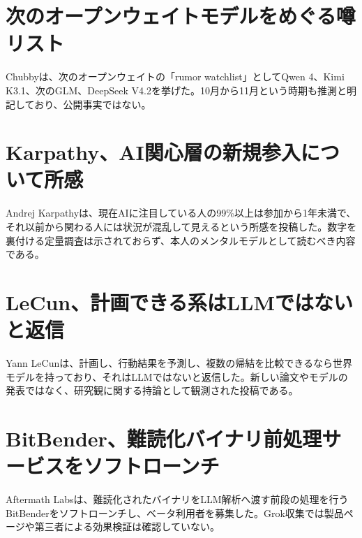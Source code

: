 \section{次のオープンウェイトモデルをめぐる噂リスト}
Chubbyは、次のオープンウェイトの「rumor watchlist」としてQwen 4、Kimi K3.1、次のGLM、DeepSeek V4.2を挙げた。10月から11月という時期も推測と明記しており、公開事実ではない。

\section{Karpathy、AI関心層の新規参入について所感}
Andrej Karpathyは、現在AIに注目している人の99\%以上は参加から1年未満で、それ以前から関わる人には状況が混乱して見えるという所感を投稿した。数字を裏付ける定量調査は示されておらず、本人のメンタルモデルとして読むべき内容である。

\section{LeCun、計画できる系はLLMではないと返信}
Yann LeCunは、計画し、行動結果を予測し、複数の帰結を比較できるなら世界モデルを持っており、それはLLMではないと返信した。新しい論文やモデルの発表ではなく、研究観に関する持論として観測された投稿である。

\section{BitBender、難読化バイナリ前処理サービスをソフトローンチ}
Aftermath Labsは、難読化されたバイナリをLLM解析へ渡す前段の処理を行うBitBenderをソフトローンチし、ベータ利用者を募集した。Grok収集では製品ページや第三者による効果検証は確認していない。

